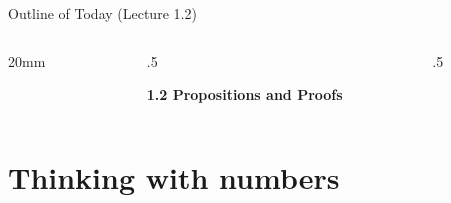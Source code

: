 \documentclass[11pt,aspectratio=1610]{beamer}
\begin{document}
	
	\hypersetup{linkcolor=blue}
	\begin{frame}{Outline of Today (Lecture 1.2)}
	
	\vspace{3mm}


\begin{center}

\begin{columns}[t]
	\begin{column}{20mm}
		~
	\end{column}

			\begin{column}{.5\textwidth}
				
				
\textbf{1.2 Propositions and Proofs}\\
\vspace{5mm}

				\tableofcontents[sections={2-3}]
			\end{column}
			



			\begin{column}{.5\textwidth}
%
			\end{column}
\end{columns}

\end{center}		
	\end{frame}
	\hypersetup{linkcolor=mygray}
	

\section{Thinking with numbers}
\end{document}
